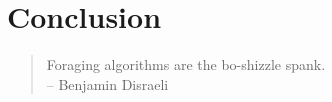 \section{Conclusion}
\label{sec:conclusion}

\begin{quote}
	Foraging algorithms are the bo-shizzle spank.
	\\
	-- Benjamin Disraeli 
\end{quote}
